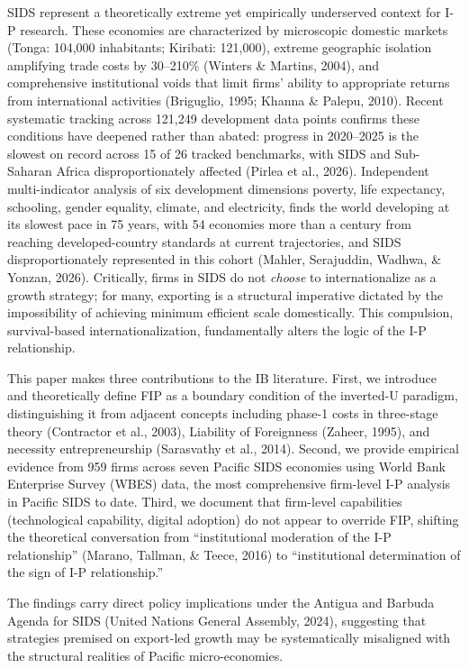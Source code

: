 \documentclass[
  12pt,a4paper]{article}
\begin{document}
SIDS represent a theoretically extreme yet empirically underserved
context for I-P research. These economies are characterized by
microscopic domestic markets (Tonga: 104,000 inhabitants; Kiribati:
121,000), extreme geographic isolation amplifying trade costs by
30--210\% (Winters \& Martins, 2004), and comprehensive institutional
voids that limit firms' ability to appropriate returns from
international activities (Briguglio, 1995; Khanna \& Palepu, 2010).
Recent systematic tracking across 121,249 development data points
confirms these conditions have deepened rather than abated: progress in
2020--2025 is the slowest on record across 15 of 26 tracked benchmarks,
with SIDS and Sub-Saharan Africa disproportionately affected (Pirlea et
al., 2026). Independent multi-indicator analysis of six development
dimensions poverty, life expectancy, schooling, gender equality,
climate, and electricity, finds the world developing at its slowest pace
in 75 years, with 54 economies more than a century from reaching
developed-country standards at current trajectories, and SIDS
disproportionately represented in this cohort (Mahler, Serajuddin,
Wadhwa, \& Yonzan, 2026). Critically, firms in SIDS do not \emph{choose}
to internationalize as a growth strategy; for many, exporting is a
structural imperative dictated by the impossibility of achieving minimum
efficient scale domestically. This compulsion, survival-based
internationalization, fundamentally alters the logic of the I-P
relationship.

This paper makes three contributions to the IB literature. First, we
introduce and theoretically define FIP as a boundary condition of the
inverted-U paradigm, distinguishing it from adjacent concepts including
phase-1 costs in three-stage theory (Contractor et al., 2003), Liability
of Foreignness (Zaheer, 1995), and necessity entrepreneurship
(Sarasvathy et al., 2014). Second, we provide empirical evidence from
959 firms across seven Pacific SIDS economies using World Bank
Enterprise Survey (WBES) data, the most comprehensive firm-level I-P
analysis in Pacific SIDS to date. Third, we document that firm-level
capabilities (technological capability, digital adoption) do not appear
to override FIP, shifting the theoretical conversation from
``institutional moderation of the I-P relationship'' (Marano, Tallman,
\& Teece, 2016) to ``institutional determination of the sign of I-P
relationship.''

The findings carry direct policy implications under the Antigua and
Barbuda Agenda for SIDS (United Nations General Assembly, 2024),
suggesting that strategies premised on export-led growth may be
systematically misaligned with the structural realities of Pacific
micro-economies.
\end{document}

